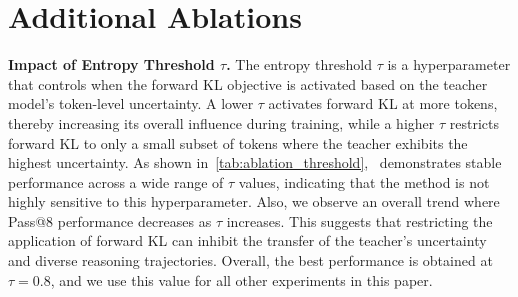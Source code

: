 \section{Additional Ablations}
\label{app:ablations}
\textbf{Impact of Entropy Threshold $\tau$.}
The entropy threshold $\tau$ is a hyperparameter that controls when the forward KL objective is activated based on the teacher model’s token-level uncertainty. A lower $\tau$ activates forward KL at more tokens, thereby increasing its overall influence during training, while a higher $\tau$ restricts forward KL to only a small subset of tokens where the teacher exhibits the highest uncertainty.
As shown in~\autoref{tab:ablation_threshold}, \method~demonstrates stable performance across a wide range of $\tau$ values, indicating that the method is not highly sensitive to this hyperparameter. Also, we observe an overall trend where Pass@8 performance decreases as $\tau$ increases. This suggests that restricting the application of forward KL can inhibit the transfer of the teacher’s uncertainty and diverse reasoning trajectories.
Overall, the best performance is obtained at $\tau = 0.8$, and we use this value for all other experiments in this paper.

\begin{table}[ht]
\centering
\small
\caption{Performance variation with respect to the entropy threshold $\tau$ for the Qwen3-1.7B-Base student. \method~is not highly sensitive to $\tau$, while we observe an overall trend where Pass@8 performance decreases as $\tau$ increases.}
\label{tab:ablation_threshold}
\end{table}

